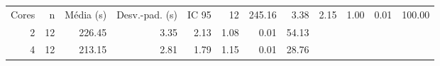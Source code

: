 \begin{tabular}{rrrrrrrr}
\toprule
Cores & n & Média (s) & Desv.-pad. (s) & IC 95%
 & 12 & 245.16 & 3.38 & 2.15 & 1.00 & 0.01 & 100.00 \\
2 & 12 & 226.45 & 3.35 & 2.13 & 1.08 & 0.01 & 54.13 \\
4 & 12 & 213.15 & 2.81 & 1.79 & 1.15 & 0.01 & 28.76 \\
\bottomrule
\end{tabular}
